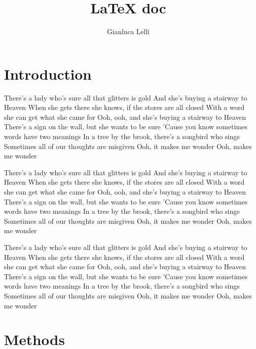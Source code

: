 \documentclass[12 pt]{article} %
\title{LaTeX doc}
\author{Gianluca Lelli}
\begin{document}

\maketitle %
\tableofcontents %
\newpage
\section{Introduction}%
\label{sec:intro}
There's a lady who's sure all that glitters is gold
And she's buying a stairway to Heaven
When she gets there she knows, if the stores are all closed
With a word she can get what she came for
Ooh, ooh, and she's buying a stairway to Heaven
There's a sign on the wall, but she wants to be sure
'Cause you know sometimes words have two meanings
In a tree by the brook, there's a songbird who sings
Sometimes all of our thoughts are misgiven
Ooh, it makes me wonder
Ooh, makes me wonder

There's a lady who's sure all that glitters is gold
And she's buying a stairway to Heaven
When she gets there she knows, if the stores are all closed
With a word she can get what she came for
Ooh, ooh, and she's buying a stairway to Heaven
There's a sign on the wall, but she wants to be sure
'Cause you know sometimes words have two meanings
In a tree by the brook, there's a songbird who sings
Sometimes all of our thoughts are misgiven
Ooh, it makes me wonder
Ooh, makes me wonder

\noindent There's a lady who's sure all that glitters is gold
And she's buying a stairway to Heaven
When she gets there she knows, if the stores are all closed
With a word she can get what she came for
Ooh, ooh, and she's buying a stairway to Heaven
There's a sign on the wall, but she wants to be sure
'Cause you know sometimes words have two meanings
In a tree by the brook, there's a songbird who sings
Sometimes all of our thoughts are misgiven
Ooh, it makes me wonder
Ooh, makes me wonder %



\section{Methods}
\end{document}
